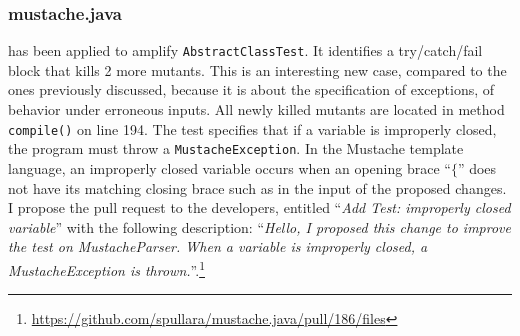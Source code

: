\subsubsection{mustache.java}


\dspot has been applied to amplify \texttt{AbstractClassTest}. 
It identifies a try/catch/fail block that kills 2 more mutants.
This is an interesting new case, compared to the ones previously discussed, because it is about the specification of exceptions, \ie of behavior under erroneous inputs.
All newly killed mutants are located in method \texttt{compile()} on line 194.
The test specifies that if a variable is improperly closed, the program must throw a \texttt{MustacheException}. 
In the Mustache template language, an improperly closed variable occurs when an opening brace ``$\{$'' does not have its matching closing brace such as in the input of the proposed changes. 
I propose the pull request to the developers, entitled ``\emph{Add Test: improperly closed variable}'' with the following description: ``\emph{Hello, I proposed this change to improve the test on MustacheParser. When a variable is improperly closed, a MustacheException is thrown.}''.\footnote{\url{https://github.com/spullara/mustache.java/pull/186/files}}
